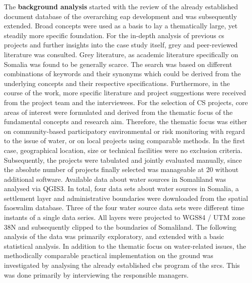 The \textbf{background analysis} started with the review of the already established document database of the overarching \acrshort{eap} development and was subsequently extended. Broad concepts were used as a basis to lay a thematically large, yet steadily more specific foundation. For the in-depth analysis of previous \acrshort{cs} projects and further insights into the case study itself, grey and peer-reviewed literature was consulted. Grey literature, as academic literature specifically on Somalia was found to be generally scarce. The search was based on different combinations of keywords and their synonyms which could be derived from the underlying concepts and their respective specifications. Furthermore, in the course of the work, more specific literature and project suggestions were received from the project team and the interviewees. For the selection of CS projects, core areas of interest were formulated and derived from the thematic focus of the fundamental concepts and research aim. Therefore, the thematic focus was either on community-based participatory environmental or risk monitoring with regard to the issue of water, or on local projects using comparable methods. In the first case, geographical location, size or technical facilities were no exclusion criteria. Subsequently, the projects were tabulated and jointly evaluated manually, since the absolute number of projects finally selected was manageable at 20 without additional software.\newline
Available data about water sources in Somaliland was analysed via QGIS3. In total, four data sets about water sources in Somalia, a settlement layer and administrative boundaries were downloaded from the spatial \acrshort{fao}\acrshort{swalim} database. Three of the four water source data sets were different time instants of a single data series. All layers were projected to WGS84 / UTM zone 38N and subsequently clipped to the boundaries of Somaliland. The following analysis of the data was primarily exploratory, and extended with a basic statistical analysis.\newline %
In addition to the thematic focus on water-related issues, the methodically comparable practical implementation on the ground was investigated by analysing the already established \acrshort{cbs} program of the \acrshort{srcs}. This was done primarily by interviewing the responsible managers.

